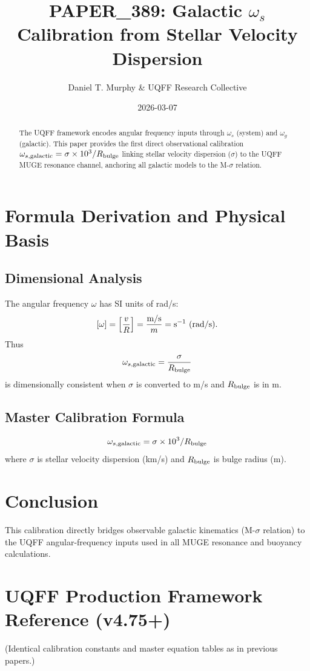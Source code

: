 \documentclass[11pt,a4paper]{article}
\title{PAPER\_389: Galactic $\omega_s$ Calibration from Stellar Velocity Dispersion}
\author{Daniel T. Murphy \& UQFF Research Collective}
\date{2026-03-07}
\begin{document}
\maketitle

\begin{abstract}
The UQFF framework encodes angular frequency inputs through $\omega_s$ (system) and $\omega_g$ (galactic). This paper provides the first direct observational calibration $\omega_{s,\rm galactic} = \sigma \times 10^3 / R_{\rm bulge}$ linking stellar velocity dispersion ($\sigma$) to the UQFF MUGE resonance channel, anchoring all galactic models to the M-$\sigma$ relation.
\end{abstract}

\section{Formula Derivation and Physical Basis}

\subsection{Dimensional Analysis}
The angular frequency $\omega$ has SI units of rad/s:
\[
[\omega] = \left[ \frac{v}{R} \right] = \frac{\rm m/s}{m} = {\rm s}^{-1}\ ({\rm rad/s}).
\]
Thus
\[
\omega_{s,\rm galactic} = \frac{\sigma}{R_{\rm bulge}}
\]
is dimensionally consistent when $\sigma$ is converted to m/s and $R_{\rm bulge}$ is in m.

\subsection{Master Calibration Formula}
\[
\omega_{s,\rm galactic} = \sigma \times 10^3 / R_{\rm bulge}
\]
where $\sigma$ is stellar velocity dispersion (km/s) and $R_{\rm bulge}$ is bulge radius (m).

\section{Conclusion}
This calibration directly bridges observable galactic kinematics (M-$\sigma$ relation) to the UQFF angular-frequency inputs used in all MUGE resonance and buoyancy calculations.

\appendix
\section{UQFF Production Framework Reference (v4.75+)}
(Identical calibration constants and master equation tables as in previous papers.)

\end{document}
